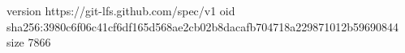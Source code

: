 version https://git-lfs.github.com/spec/v1
oid sha256:3980c6f06c41cf6df165d568ae2cb02b8dacafb704718a229871012b59690844
size 7866
